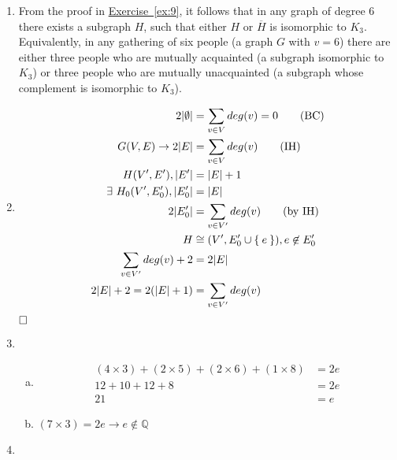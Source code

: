 \documentclass[nobib]{tufte-book}
\DeclarePairedDelimiter\abs{\lvert}{\rvert}
\begin{document}
\begin{enumerate}
    \item From the proof in \hyperref[ex:9]{Exercise~\ref{ex:9}}, it follows
      that in any graph of degree $6$ there exists a subgraph $H$, such that
      either $H$ or $\overline{H}$ is isomorphic to $K_{3}$. Equivalently, in
      any gathering of six people (a graph $G$ with $v=6$) there are either
      three people who are mutually acquainted (a subgraph isomorphic to
      $K_{3}$) or three people who are mutually unacquainted (a subgraph whose
      complement is isomorphic to $K_{3}$).

    \item
      \begin{align}
        2\abs{\emptyset} &= \sum_{v \in V} deg(v) = 0 \tag{BC} \\
        G(V,E) \to 2\abs{E} &= \sum_{v \in V} deg(v) \tag{IH} \\
        H(V^{\prime}, E^{\prime}), \abs{E^{\prime}} &= \abs{E} + 1 \\
        \exists\ H_{0}(V^{\prime}, E^{\prime}_{0}), \abs{E^{\prime}_{0}} &= \abs{E} \\
        2\abs{E^{\prime}_{0}} &= \sum_{v \in V^{\prime}} deg(v) \tag{by IH}\\
        H &\cong (V^{\prime}, E_{0}^{\prime} \cup \Set{e}), e \not\in E_{0}^{\prime} \\
        \sum_{v \in V^{\prime}} deg(v) + 2 &= 2\abs{E} \\
        2\abs{E} + 2 = 2(\abs{E} + 1) &= \sum_{v \in V^{\prime}} deg(v)
      \end{align}
      $\hfill\square$

    \item
      \begin{enumerate}[a)]
      \item
        \begin{align*}
          (4 \times 3) + (2 \times 5) + (2 \times 6) + (1 \times 8) &= 2e \\
          12 + 10 + 12 + 8 &= 2e \\
          21 &= e
        \end{align*}
      \item $(7 \times 3) = 2e \to e \not\in \mathbb{Q}$
      \end{enumerate}
    \item {}
\end{enumerate}

\backmatter

\printglossaries
\end{document}

